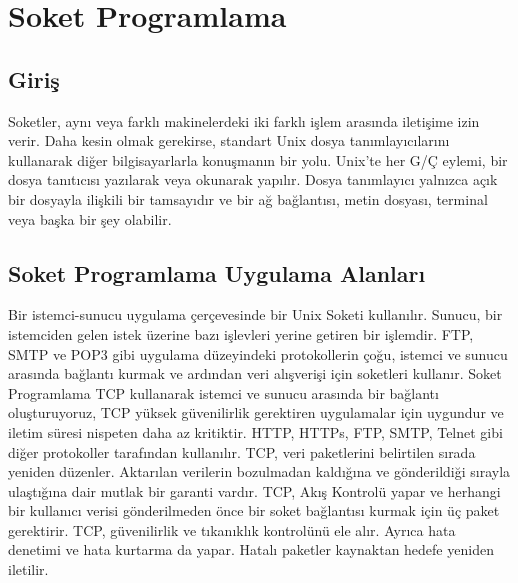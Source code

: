 \chapter{Soket Programlama}

\vspace{10mm}
\section{Giriş}
Soketler, aynı veya farklı makinelerdeki iki farklı işlem arasında iletişime izin verir. Daha kesin olmak gerekirse, standart Unix dosya tanımlayıcılarını kullanarak diğer bilgisayarlarla konuşmanın bir yolu. Unix'te her G/Ç eylemi, bir dosya tanıtıcısı yazılarak veya okunarak yapılır. Dosya tanımlayıcı yalnızca açık bir dosyayla ilişkili bir tamsayıdır ve bir ağ bağlantısı, metin dosyası, terminal veya başka bir şey olabilir.


\vspace{10mm}

\section{Soket Programlama Uygulama Alanları}

Bir istemci-sunucu uygulama çerçevesinde bir Unix Soketi kullanılır. Sunucu, bir istemciden gelen istek üzerine bazı işlevleri yerine getiren bir işlemdir. FTP, SMTP ve POP3 gibi uygulama düzeyindeki protokollerin çoğu, istemci ve sunucu arasında bağlantı kurmak ve ardından veri alışverişi için soketleri kullanır.
Soket Programlama TCP kullanarak istemci ve sunucu arasında bir bağlantı oluşturuyoruz, TCP yüksek güvenilirlik gerektiren uygulamalar için uygundur ve iletim süresi nispeten daha az kritiktir. HTTP, HTTPs, FTP, SMTP, Telnet gibi diğer protokoller tarafından kullanılır. TCP, veri paketlerini belirtilen sırada yeniden düzenler. Aktarılan verilerin bozulmadan kaldığına ve gönderildiği sırayla ulaştığına dair mutlak bir garanti vardır. TCP, Akış Kontrolü yapar ve herhangi bir kullanıcı verisi gönderilmeden önce bir soket bağlantısı kurmak için üç paket gerektirir. TCP, güvenilirlik ve tıkanıklık kontrolünü ele alır. Ayrıca hata denetimi ve hata kurtarma da yapar. Hatalı paketler kaynaktan hedefe yeniden iletilir.
\vspace{10mm}

\newpage
